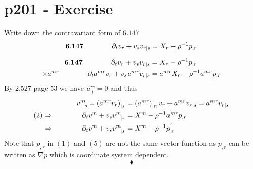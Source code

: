 \section{p201 - Exercise}
\begin{tcolorbox}
Write down the contravariant form of $\mathbf{6.147}$
$$\mathbf{6.147} \quad\quad\quad\quad \partial_t v_r + v_s v_{r|s} = X_r - \rho^{-1} p_{,r}$$
\end{tcolorbox}
\begin{align}
\mathbf{6.147} \quad\quad\quad\quad \partial_t v_r + v_s v_{r|s} &= X_r - \rho^{-1} p_{,r}\\
\times a^{mr}\quad\quad\quad\quad \partial_t a^{mr} v_r + v_s a^{mr}v_{r|s} &= a^{mr}X_r - \rho^{-1} a^{mr}p_{,r}
\end{align}
By $\mathbf{2.527}$ page 53 we  have $a^{rs}_{|t}=0$ and thus 
\begin{align}
v^{m}_{\ |s}= \left(a^{mr}v_{r}\right)_{|s} &= \left(a^{mr}\right)_{|n}v_{r}+a^{mr}v_{r|s}= a^{mr}v_{r|s} \\
(2) \Rightarrow \quad\quad\quad\quad \partial_t  v^m + v_s v^{m}_{\ \ |s} &= X^m - \rho^{-1} a^{mr}p_{,r}\\
 \Rightarrow \quad\quad\quad\quad \partial_t  v^m + v_s v^{m}_{\ \ |s} &= X^m - \rho^{-1} p^{'}_{,r}
\end{align}
Note that $p_{,r}$ in $(1)$ and $(5)$ are not the same vector function as $p_{,r}$ can be written as $\overline{\nabla}p$ which is coordinate system  dependent.
 $$\blacklozenge$$
\newpage

